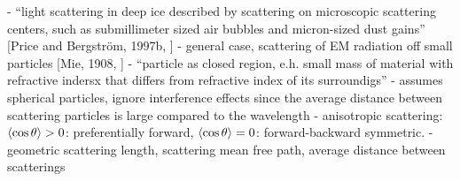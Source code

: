 - ``light scattering in deep ice described by scattering on microscopic scattering centers, such as submillimeter sized air bubbles and micron-sized dust gains'' [Price and Bergström, 1997b, \cite{ackermann}]
- general case, scattering of EM radiation off small particles [Mie, 1908, \cite{ackermann}]
- ``particle as closed region, e.h. small mass of material with refractive indersx that differs from refractive index of its surroundigs'' \cite{ackermann}
- assumes spherical particles, ignore interference effects since the average distance between scattering particles is large compared to the wavelength \cite{ackermann}
- anisotropic scattering: $\langle \cos \theta \rangle > 0$: preferentially forward, $\langle \cos \theta \rangle = 0$: forward-backward symmetric. \cite{ackermann}
- geometric scattering length, scattering mean free path, average distance between scatterings \cite{ackermann}
